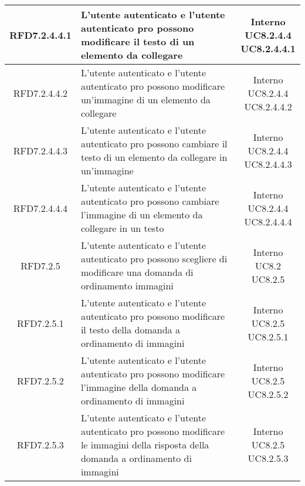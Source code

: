 \begin{longtable}{|c|>{\centering}m{7cm}|c|}
			 \hypertarget{{RFD7.2.4.4.1}}{{RFD7.2.4.4.1}} & L’utente autenticato e l’utente
autenticato pro possono modificare il
testo di un elemento da collegare & \makecell{Interno\\ UC8.2.4.4 \\UC8.2.4.4.1 } \\ \hline
			 \hypertarget{{RFD7.2.4.4.2}}{{RFD7.2.4.4.2}} & L’utente autenticato e l’utente
autenticato pro possono modificare
un’immagine di un elemento da collegare & \makecell{Interno\\ UC8.2.4.4 \\UC8.2.4.4.2 } \\ \hline
			 \hypertarget{{RFD7.2.4.4.3}}{{RFD7.2.4.4.3}} & L’utente autenticato e l’utente
autenticato pro possono cambiare il testo
di un elemento da collegare in
un’immagine & \makecell{Interno\\ UC8.2.4.4 \\UC8.2.4.4.3 } \\ \hline
			 \hypertarget{{RFD7.2.4.4.4}}{{RFD7.2.4.4.4}} & L’utente autenticato e l’utente
autenticato pro possono cambiare
l’immagine di un elemento da collegare in
un testo & \makecell{Interno\\ UC8.2.4.4 \\UC8.2.4.4.4 } \\ \hline
			 \hypertarget{{RFD7.2.5}}{{RFD7.2.5}} & L’utente autenticato e l’utente
autenticato pro possono scegliere di
modificare una domanda di ordinamento
immagini & \makecell{Interno\\ UC8.2 \\UC8.2.5 } \\ \hline
			 \hypertarget{{RFD7.2.5.1}}{{RFD7.2.5.1}} & L’utente autenticato e l’utente
autenticato pro possono modificare il
testo della domanda a ordinamento di
immagini & \makecell{Interno\\ UC8.2.5 \\UC8.2.5.1 } \\ \hline
			 \hypertarget{{RFD7.2.5.2}}{{RFD7.2.5.2}} & L’utente autenticato e l’utente
autenticato pro possono modificare
l’immagine della domanda a ordinamento
di immagini & \makecell{Interno\\ UC8.2.5 \\UC8.2.5.2 } \\ \hline
			 \hypertarget{{RFD7.2.5.3}}{{RFD7.2.5.3}} & L’utente autenticato e l’utente
autenticato pro possono modificare le
immagini della risposta della domanda a
ordinamento di immagini & \makecell{Interno\\ UC8.2.5 \\UC8.2.5.3 } \\ \hline

\end{longtable}
